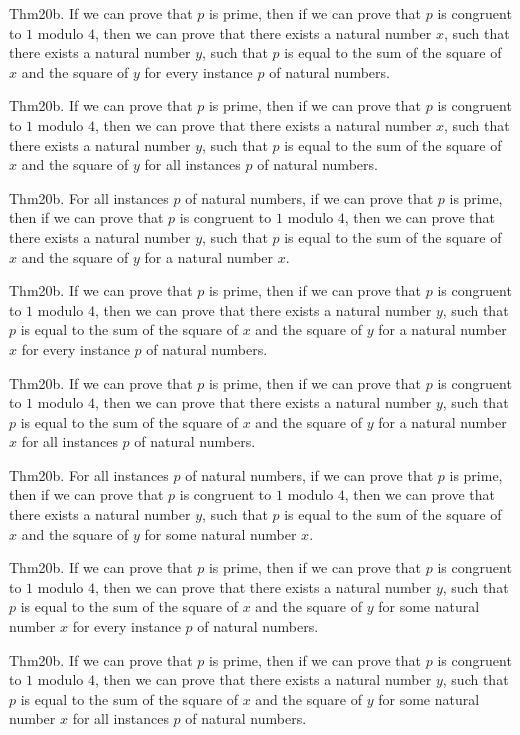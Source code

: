 \documentclass{article}
\begin{document}
Thm20b. If we can prove that $p$ is prime, then if we can prove that $p$ is congruent to $1$ modulo $4$, then we can prove that there exists a natural number $x$, such that there exists a natural number $y$, such that $p$ is equal to the sum of the square of $x$ and the square of $y$ for every instance $p$ of natural numbers.

Thm20b. If we can prove that $p$ is prime, then if we can prove that $p$ is congruent to $1$ modulo $4$, then we can prove that there exists a natural number $x$, such that there exists a natural number $y$, such that $p$ is equal to the sum of the square of $x$ and the square of $y$ for all instances $p$ of natural numbers.

Thm20b. For all instances $p$ of natural numbers, if we can prove that $p$ is prime, then if we can prove that $p$ is congruent to $1$ modulo $4$, then we can prove that there exists a natural number $y$, such that $p$ is equal to the sum of the square of $x$ and the square of $y$ for a natural number $x$.

Thm20b. If we can prove that $p$ is prime, then if we can prove that $p$ is congruent to $1$ modulo $4$, then we can prove that there exists a natural number $y$, such that $p$ is equal to the sum of the square of $x$ and the square of $y$ for a natural number $x$ for every instance $p$ of natural numbers.

Thm20b. If we can prove that $p$ is prime, then if we can prove that $p$ is congruent to $1$ modulo $4$, then we can prove that there exists a natural number $y$, such that $p$ is equal to the sum of the square of $x$ and the square of $y$ for a natural number $x$ for all instances $p$ of natural numbers.

Thm20b. For all instances $p$ of natural numbers, if we can prove that $p$ is prime, then if we can prove that $p$ is congruent to $1$ modulo $4$, then we can prove that there exists a natural number $y$, such that $p$ is equal to the sum of the square of $x$ and the square of $y$ for some natural number $x$.

Thm20b. If we can prove that $p$ is prime, then if we can prove that $p$ is congruent to $1$ modulo $4$, then we can prove that there exists a natural number $y$, such that $p$ is equal to the sum of the square of $x$ and the square of $y$ for some natural number $x$ for every instance $p$ of natural numbers.

Thm20b. If we can prove that $p$ is prime, then if we can prove that $p$ is congruent to $1$ modulo $4$, then we can prove that there exists a natural number $y$, such that $p$ is equal to the sum of the square of $x$ and the square of $y$ for some natural number $x$ for all instances $p$ of natural numbers.
\end{document}
